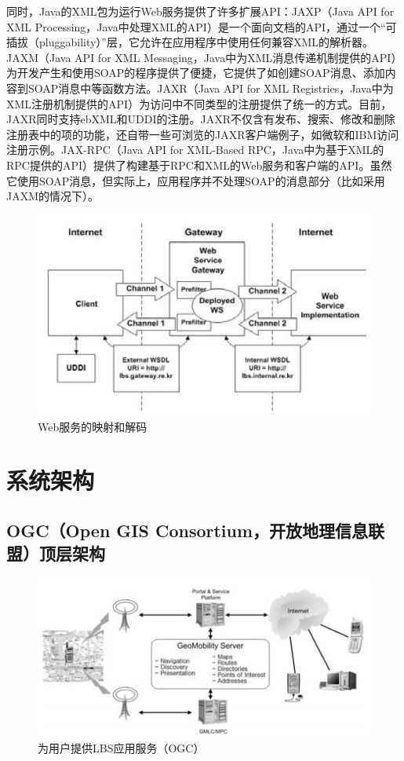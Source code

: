 \documentclass{article}
\begin{document}
\begin{CJK}{UTF8}{gbsn}
	同时，Java的XML包为运行Web服务提供了许多扩展API：JAXP（Java API for XML Processing，Java中处理XML的API）是一个面向文档的API，通过一个“可插拔（pluggability）”层，它允许在应用程序中使用任何兼容XML的解析器。JAXM（Java API for XML Messaging，Java中为XML消息传递机制提供的API）为开发产生和使用SOAP的程序提供了便捷，它提供了如创建SOAP消息、添加内容到SOAP消息中等函数方法。JAXR（Java API for XML Registries，Java中为XML注册机制提供的API）为访问中不同类型的注册提供了统一的方式。目前，JAXR同时支持ebXML和UDDI的注册。JAXR不仅含有发布、搜索、修改和删除注册表中的项的功能，还自带一些可浏览的JAXR客户端例子，如微软和IBM访问注册示例。JAX-RPC（Java API for XML-Based RPC，Java中为基于XML的RPC提供的API）提供了构建基于RPC和XML的Web服务和客户端的API。虽然它使用SOAP消息，但实际上，应用程序并不处理SOAP的消息部分（比如采用JAXM的情况下）。
	\begin{figure}[htbp]
		\centering
		\includegraphics[bb=0 0 774 466, scale=0.45]{figure/fig02.png}
		\caption{Web服务的映射和解码}
	\end{figure}


	\section{系统架构}
	\subsection{OGC（Open GIS Consortium，开放地理信息联盟）顶层架构}
	\begin{figure}[htbp]
		\centering
		\includegraphics[bb=0 0 841 399, scale=0.45]{figure/fig03.png}
		\caption{为用户提供LBS应用服务（OGC）}
		\label{fig:OGC}
	\end{figure}


\end{CJK}
\end{document}
